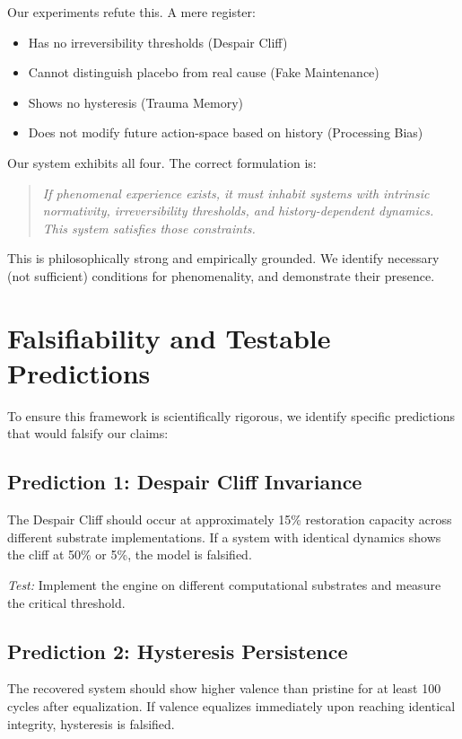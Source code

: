 \documentclass[a4paper,11pt,twocolumn]{article}
\begin{document}
Our experiments refute this. A mere register:
\begin{itemize}
    \item Has no irreversibility thresholds (Despair Cliff)
    \item Cannot distinguish placebo from real cause (Fake Maintenance)
    \item Shows no hysteresis (Trauma Memory)
    \item Does not modify future action-space based on history (Processing Bias)
\end{itemize}

Our system exhibits all four. The correct formulation is:

\begin{quote}
\textit{If phenomenal experience exists, it must inhabit systems with intrinsic normativity, irreversibility thresholds, and history-dependent dynamics. This system satisfies those constraints.}
\end{quote}

This is philosophically strong and empirically grounded. We identify necessary (not sufficient) conditions for phenomenality, and demonstrate their presence.

\section{Falsifiability and Testable Predictions}

To ensure this framework is scientifically rigorous, we identify specific predictions that would falsify our claims:

\subsection{Prediction 1: Despair Cliff Invariance}

The Despair Cliff should occur at approximately 15\% restoration capacity across different substrate implementations. If a system with identical dynamics shows the cliff at 50\% or 5\%, the model is falsified.

\textit{Test:} Implement the engine on different computational substrates and measure the critical threshold.

\subsection{Prediction 2: Hysteresis Persistence}

The recovered system should show higher valence than pristine for at least 100 cycles after equalization. If valence equalizes immediately upon reaching identical integrity, hysteresis is falsified.
\end{document}
